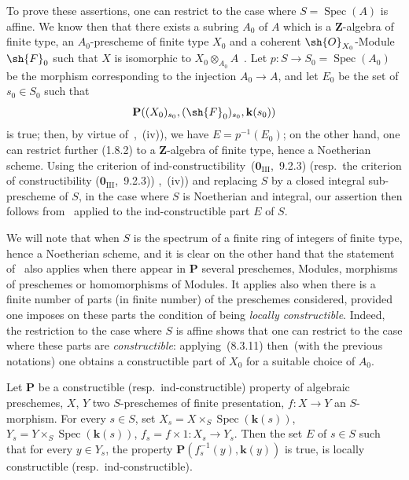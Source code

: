 To prove these assertions, one can restrict to the case where $S=\operatorname{Spec}(A)$ is affine.
We know then that there exists a subring $A_0$ of $A$ which is a $\mathbf{Z}$-algebra of finite type, an $A_0$-prescheme of finite type $X_0$ and a coherent $\sh{O}_{X_0}$-Module $\sh{F}_0$ such that $X$ is isomorphic to $X_0\otimes_{A_0}A$~.
Let $p:S\to S_0=\operatorname{Spec}(A_0)$ be the morphism corresponding to the injection $A_0\to A$, and let $E_0$ be the set of $s_0\in S_0$ such that
\[
  \mathbf{P}((X_0)_{s_0},(\sh{F}_0)_{s_0},\mathbf{k}(s_0))
\]
is true; then, by virtue of~,~(iv)), we have $E=p^{-1}(E_0)$; on the other hand, one can restrict further (1.8.2) to a $\mathbf{Z}$-algebra of finite type, hence a Noetherian scheme.
Using the criterion of ind-constructibility~($\mathbf{0}_{\mathrm{III}}$,~9.2.3) (resp.\ the criterion of constructibility ($\mathbf{0}_{\mathrm{III}}$,~9.2.3))
,~(iv)) and replacing $S$ by a closed integral sub-prescheme of $S$, in the case where $S$ is Noetherian and integral, our assertion then follows from~ applied to the ind-constructible part $E$ of $S$.

We will note that when $S$ is the spectrum of a finite ring of integers of finite type, hence a Noetherian scheme, and it is clear on the other hand that the statement of~ also applies when there appear in $\mathbf{P}$ several preschemes, Modules, morphisms of preschemes or homomorphisms of Modules.
It applies also when there is a finite number of parts (in finite number) of the preschemes considered, provided one imposes on these parts the condition of being \emph{locally constructible}.
Indeed, the restriction to the case where $S$ is affine shows that one can restrict to the case where these parts are \emph{constructible}: applying~(8.3.11) then~(with the previous notations) one obtains a constructible part of $X_0$ for a suitable choice of $A_0$.

\begin{corollary}[9.2.4]
\label{IV.9.2.4}
Let $\mathbf{P}$ be a constructible \textnormal{(}resp.\ ind-constructible\textnormal{)} property of algebraic preschemes, $X$, $Y$ two $S$-preschemes of finite presentation, $f:X\to Y$ an $S$-morphism.
For every $s\in S$, set $X_s=X\times_S\operatorname{Spec}(\mathbf{k}(s))$, $Y_s=Y\times_S\operatorname{Spec}(\mathbf{k}(s))$, $f_s=f\times 1:X_s\to Y_s$.
Then the set $E$ of $s\in S$ such that for every $y\in Y_s$, the property $\mathbf{P}(f_s^{-1}(y),\mathbf{k}(y))$ is true, is locally constructible \textnormal{(}resp.\ ind-constructible\textnormal{)}.
\end{corollary}

